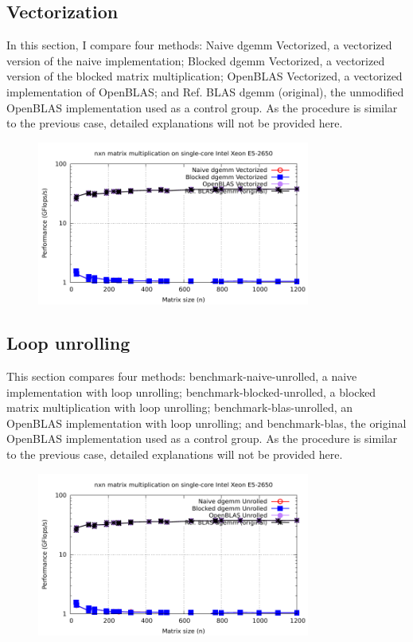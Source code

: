 \documentclass[unicode,11pt,a4paper,oneside,numbers=endperiod,openany]{scrartcl}
\begin{document}
\subsection{Vectorization}
In this section, I compare four methods: Naive dgemm Vectorized, a vectorized version of the naive implementation; Blocked dgemm Vectorized, a vectorized version of the blocked matrix multiplication; OpenBLAS Vectorized, a vectorized implementation of OpenBLAS; and Ref. BLAS dgemm (original), the unmodified OpenBLAS implementation used as a control group. As the procedure is similar to the previous case, detailed explanations will not be provided here.
\begin{figure}[h]
    \centering
    \includegraphics[width=0.8\textwidth]{pictures/timimg_Vectorization.pdf}
    
\end{figure}
\subsection{Loop unrolling}
This section compares four methods: benchmark-naive-unrolled, a naive implementation with loop unrolling; benchmark-blocked-unrolled, a blocked matrix multiplication with loop unrolling; benchmark-blas-unrolled, an OpenBLAS implementation with loop unrolling; and benchmark-blas, the original OpenBLAS implementation used as a control group. As the procedure is similar to the previous case, detailed explanations will not be provided here.
\begin{figure}[h]
    \centering
    \includegraphics[width=0.8\textwidth]{pictures/timimg_loop copy.pdf}
    
\end{figure}
\printbibliography
\appendix
\end{document}
